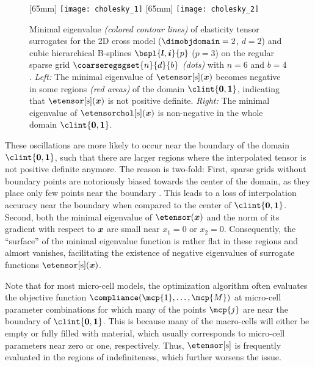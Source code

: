 \begin{figure}
  [65mm]{%
    \texttt{[image: cholesky\_1]}%
  }%
  \hfill%
  [65mm]{%
    \texttt{[image: cholesky\_2]}%
  }%
  \hfill\hfill%
  \caption[%
    Minimal eigenvalue of interpolated elasticity tensors%
  ]{%
    Minimal eigenvalue \emph{(colored contour lines)}
    of elasticity tensor surrogates
    for the 2D cross model ($\dimobjdomain = 2$, $d = 2$)
    \vspace{-0.3em}%
    and cubic hierarchical B-splines $\bspl{\*l,\*i}{p}$ ($p = 3$) on
    the regular sparse grid $\coarseregsgset{n}{d}{b}$ \emph{(dots)}
    with $n = 6$ and $b = 4$.
    \emph{Left:} The minimal eigenvalue of $\etensorintp(\*x)$
    becomes negative in some regions \emph{\textcolor{C1}{(red areas)}}
    of the domain $\clint{\*0, \*1}$,
    indicating that $\etensorintp(\*x)$ is not positive definite.
    \emph{Right:} The minimal eigenvalue of $\etensorcholintp(\*x)$
    is non-negative in the whole domain $\clint{\*0, \*1}$.%
  }%
  \label{fig:cholesky}%
\end{figure}

These oscillations are more likely to occur near the boundary of the domain
$\clint{\*0, \*1}$, such that there are larger regions
where the interpolated tensor is not positive definite anymore.
The reason is two-fold:
First, sparse grids without boundary points
are notoriously biased towards the center of the domain,
as they place only few points near the boundary \cite{Pflueger10Spatially}.
This leads to a loss of interpolation accuracy near the boundary
when compared to the center of $\clint{\*0, \*1}$.
Second, both the minimal eigenvalue of $\etensor(\*x)$ and the norm of its
gradient with respect to ${\boldsymbol{x}}$ are small near $x_1 = 0$ or $x_2 = 0$.
Consequently, the ``surface'' of the minimal eigenvalue function
is rather flat in these regions and almost vanishes,
facilitating the existence of negative eigenvalues of
surrogate functions $\etensorintp(\*x)$.

Note that for most micro-cell models,
the optimization algorithm often evaluates the objective function
$\compliance(\mcp{1}, \dotsc, \mcp{M})$ at micro-cell parameter
combinations for which many of the points $\mcp{j}$ are near the boundary
of $\clint{\*0, \*1}$.
This is because many of the macro-cells will either be empty or
fully filled with material, which usually corresponds to micro-cell
parameters near zero or one, respectively.
Thus, $\etensorintp$ is frequently evaluated in the regions of
indefiniteness, which further worsens the issue.

